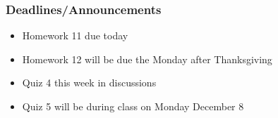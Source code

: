 
\begin{frame}
    \frametitle{Deadlines/Announcements}
\begin{itemize}
            \item Homework 11 due today
            \item Homework 12 will be due the Monday after Thanksgiving
            \item Quiz 4 this week in discussions
            \item Quiz 5 will be during class on Monday December 8
        \end{itemize}
\end{frame}


